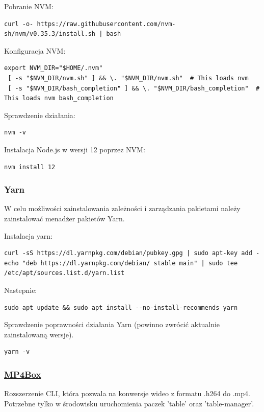 Pobranie NVM:
\begin{lstlisting}
curl -o- https://raw.githubusercontent.com/nvm-sh/nvm/v0.35.3/install.sh | bash
\end{lstlisting}

Konfiguracja NVM:
\begin{lstlisting}[breaklines=true]
export NVM_DIR="$HOME/.nvm"
 [ -s "$NVM_DIR/nvm.sh" ] && \. "$NVM_DIR/nvm.sh"  # This loads nvm
 [ -s "$NVM_DIR/bash_completion" ] && \. "$NVM_DIR/bash_completion"  # This loads nvm bash_completion
\end{lstlisting}

Sprawdzenie działania:
\begin{lstlisting}
nvm -v
\end{lstlisting}

Instalacja Node.js w wersji 12 poprzez NVM:
\begin{lstlisting}
nvm install 12
\end{lstlisting}

\subsubsection{Yarn}
W celu możliwości zainstalowania zależności i zarządzania pakietami należy zainstalować menadżer pakietów Yarn.

Instalacja yarn:
\begin{lstlisting}[breaklines=true]
curl -sS https://dl.yarnpkg.com/debian/pubkey.gpg | sudo apt-key add -echo "deb https://dl.yarnpkg.com/debian/ stable main" | sudo tee /etc/apt/sources.list.d/yarn.list
\end{lstlisting}

Nastepnie:
\begin{lstlisting}
sudo apt update && sudo apt install --no-install-recommends yarn
\end{lstlisting}

Sprawdzenie poprawności działania Yarn (powinno zwrócić aktualnie zainstalowaną wersje).
\begin{lstlisting}
yarn -v
\end{lstlisting}


\subsubsection{\href{https://www.raspberrypi.org/documentation/usage/camera/raspicam/raspivid.md}{MP4Box}}

Rozszerzenie CLI, która pozwala na konwersje wideo z formatu .h264 do .mp4. Potrzebne tylko w środowisku uruchomienia paczek 'table' oraz 'table-manager'.

